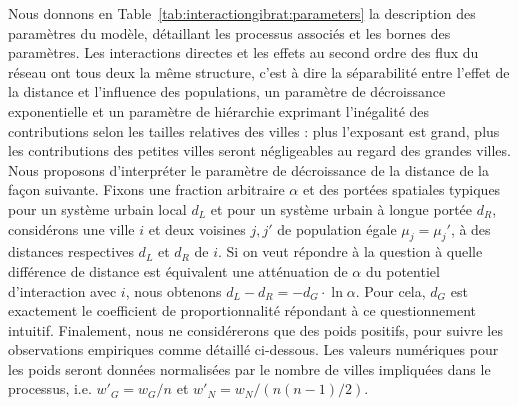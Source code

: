 {Nous donnons en Table~\ref{tab:interactiongibrat:parameters} la description des paramètres du modèle, détaillant les processus associés et les bornes des paramètres. Les interactions directes et les effets au second ordre des flux du réseau ont tous deux la même structure, c'est à dire la séparabilité entre l'effet de la distance et l'influence des populations, un paramètre de décroissance exponentielle et un paramètre de hiérarchie exprimant l'inégalité des contributions selon les tailles relatives des villes : plus l'exposant est grand, plus les contributions des petites villes seront négligeables au regard des grandes villes. Nous proposons d'interpréter le paramètre de décroissance de la distance de la façon suivante. Fixons une fraction arbitraire $\alpha$ et des portées spatiales typiques pour un système urbain local $d_L$ et pour un système urbain à longue portée $d_R$, considérons une ville $i$ et deux voisines $j,j'$ de population égale $\mu_j=\mu_j'$, à des distances respectives $d_L$ et $d_R$ de $i$. Si on veut répondre à la question à quelle différence de distance est équivalent une atténuation de $\alpha$ du potentiel d'interaction avec $i$, nous obtenons $d_L - d_R = -d_G\cdot \ln \alpha$. Pour cela, $d_G$ est exactement le coefficient de proportionnalité répondant à ce questionnement intuitif. Finalement, nous ne considérerons  que des poids positifs, pour suivre les observations empiriques comme détaillé ci-dessous. Les valeurs numériques pour les poids seront données normalisées par le nombre de villes impliquées dans le processus, i.e. ${w'}_G = w_G / n$ et ${w'}_N = w_N / (n (n-1) / 2)$.
}


